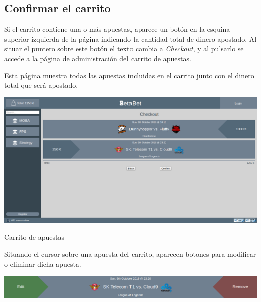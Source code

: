 \documentclass{article}
\newcommand{\myarrow}{\ding{223}}
\begin{document}
\subsection{Confirmar el carrito}
Si el carrito contiene una o más apuestas, aparece un botón en la esquina superior izquierda de la página indicando la cantidad total de dinero apostado. Al situar el puntero sobre este botón el texto cambia a \textit{Checkout}, y al pulsarlo se accede a la página de administración del carrito de apuestas.
\begin{center}
    \raisebox{-.6\height}{\scalebox{2}{\myarrow}}
\end{center}
Esta página muestra todas las apuestas incluidas en el carrito junto con el dinero total que será apostado.
\smallskip\newline
\begin{minipage}{\linewidth}
    \centering
    \captionsetup{type=figure}
    \includegraphics[width=\linewidth]{fig7}
    \caption{Carrito de apuestas}
    \label{fig:fig7}
\end{minipage}
\smallskip\newline
Situando el cursor sobre una apuesta del carrito, aparecen botones para modificar o eliminar dicha apuesta.
\begin{center}
    \includegraphics[width=.8\linewidth]{checkout3}
\end{center}
\end{document}
